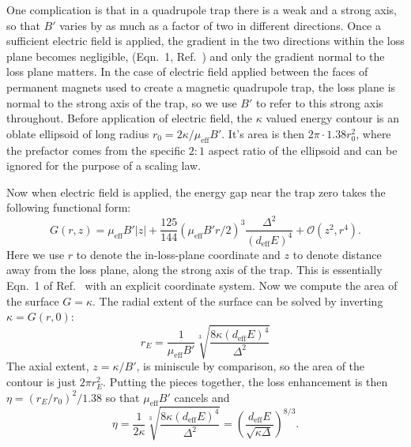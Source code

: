 \documentclass[%
 reprint,
 amsmath,amssymb,
 aps,
pra,
]{revtex4-1}
\begin{document}
One complication is that in a quadrupole trap there is a weak and a strong axis, so that $B'$ varies by as much as a factor of two in different directions.
Once a sufficient electric field is applied, the gradient in the two directions within the loss plane becomes negligible, (Eqn.~1, Ref.~\cite{smt}) and only the gradient normal to the loss plane matters.
In the case of electric field applied between the faces of permanent magnets used to create a magnetic quadrupole trap, the loss plane is normal to the strong axis of the trap, so we use $B'$ to refer to this strong axis throughout.
Before application of electric field, the $\kappa$ valued energy contour is an oblate ellipsoid of long radius $r_0=2\kappa/\mu_\text{eff}B'$. It's area is then $2\pi\cdot1.38r_0^2$, where the prefactor comes from the specific $2:1$ aspect ratio of the ellipsoid and can be ignored for the purpose of a scaling law.

Now when electric field is applied, the energy gap near the trap zero takes the following functional form:
\begin{equation}
\label{eqn:energy}
G(r,z) = \mu_\text{eff}B'|z| + \frac{125}{144}(\mu_\text{eff}B'r/2)^3\frac{\Delta^2}{(d_\text{eff}E)^4} + \mathcal{O}(z^2,r^4).
\end{equation}
Here we use $r$ to denote the in-loss-plane coordinate and $z$ to denote distance away from the loss plane, along the strong axis of the trap. 
This is essentially Eqn.~1 of Ref.~\cite{smt} with an explicit coordinate system.
Now we compute the area of the surface $G=\kappa$.
The radial extent of the surface can be solved by inverting $\kappa=G(r,0)$:
\begin{equation}
r_E = \frac{1}{\mu_\text{eff}B'}\sqrt[3]{\frac{8\kappa(d_\text{eff}E)^4}{\Delta^2}}
\end{equation}
The axial extent, $z=\kappa/B'$, is miniscule by comparison, so the area of the contour is just $2\pi r_E^2$.
Putting the pieces together, the loss enhancement is then $\eta = (r_E/r_0)^2/1.38$ so that $\mu_\text{eff}B'$ cancels and
\begin{equation}
\label{eqn:eta}
\eta= \frac{1}{2\kappa}\sqrt[3]{\frac{8\kappa(d_\text{eff}E)^4}{\Delta^2}}=\left(\frac{d_\text{eff}E}{\sqrt{\kappa\Delta}}\right)^{8/3}.
\end{equation}
\end{document}
